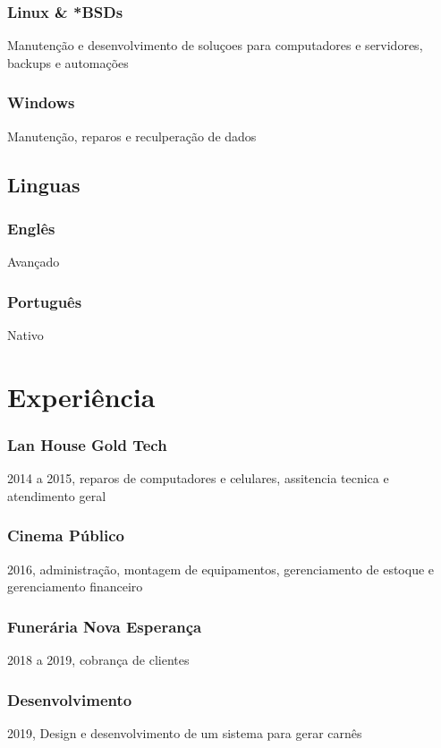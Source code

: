 \documentclass[11pt]{article}
\begin{document}
\subsubsection{Linux \& *BSDs}
\label{sec:orge5ed0c0}
Manutenção e desenvolvimento de soluçoes para computadores e servidores, backups e automações
\subsubsection{Windows}
\label{sec:org74eb917}
Manutenção, reparos e reculperação de dados
\subsection{Linguas}
\label{sec:orge9c8fdd}
\subsubsection{Englês}
\label{sec:org7f75474}
Avançado
\subsubsection{Português}
\label{sec:org53de7b2}
Nativo

\section{Experiência}
\label{sec:orgca483a6}
\subsubsection{Lan House Gold Tech}
\label{sec:org337664b}
2014 a 2015, reparos de computadores e celulares, assitencia tecnica e atendimento geral
\subsubsection{Cinema Público}
\label{sec:orgcd12de0}
2016, administração, montagem de equipamentos, gerenciamento de estoque e gerenciamento financeiro
\subsubsection{Funerária Nova Esperança}
\label{sec:org18b548c}
2018 a 2019, cobrança de clientes
\subsubsection{Desenvolvimento}
\label{sec:orgbb632dc}
2019, Design e desenvolvimento de um sistema para gerar carnês
\end{document}

